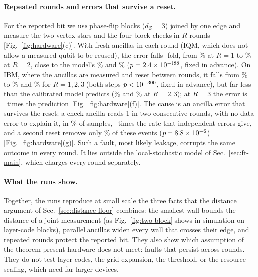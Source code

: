 \paragraph{Repeated rounds and errors that survive a reset.}
For the reported bit we use phase-flip blocks ($d_Z=3$) joined by one edge
and measure the two vertex stars and the four block checks in $R$ rounds
[Fig.~\ref{fig:hardware}(c)].  With fresh ancillas in each round (IQM, which
does not allow a measured qubit to be reused), the error falls
\hwRndIQMfold-fold, from \hwRndIQMOne\% at $R=1$ to \hwRndIQMTwo\% at $R=2$,
close to the model's \hwRndIQMModelOne\% and \hwRndIQMModelTwo\%
($p=2.4\times10^{-188}$, fixed in advance).  On IBM, where the ancillas are measured
and reset between rounds, it falls from \hwRndIBMOne\% to \hwRndIBMTwo\% and
\hwRndIBMThree\% for $R=1,2,3$ (both steps $p<10^{-300}$, fixed in
advance), but far less than the calibrated model predicts (\hwRndIBMModelTwo\%
and \hwRndIBMModelThree\% at $R=2,3$); at $R=3$ the error is
\hwRndIBMModelRatio~times the prediction [Fig.~\ref{fig:hardware}(f)].  The
cause is an ancilla error that survives the reset: a check ancilla reads 1 in
two consecutive rounds, with no data error to explain it, in \hwPersSingle\%
of samples, \hwPersRatio~times the rate that independent errors give, and a
second reset removes only \hwPersRel\% of these events ($p=8.8\times10^{-6}$)
[Fig.~\ref{fig:hardware}(g)].  Such a fault, most likely leakage, corrupts the
same outcome in every round.  It lies outside the local-stochastic model of
Sec.~\ref{sec:ft-main}, which charges every round separately.

\paragraph{What the runs show.}
Together, the runs reproduce at small scale the three facts that the distance
argument of Sec.~\ref{sec:distance-floor} combines: the smallest wall bounds
the distance of a joint measurement (as Fig.~\ref{fig:two-block} shows in
simulation on layer-code blocks), parallel ancillas widen every wall that
crosses their edge, and repeated rounds protect the reported bit.  They also
show which assumption of the theorem present hardware does not meet: faults
that persist across rounds.  They do not test layer codes, the grid
expansion, the threshold, or the resource scaling, which need far larger
devices.

